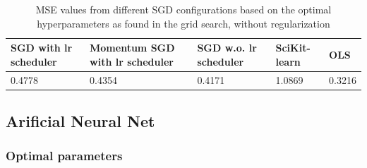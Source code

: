\documentclass
[twocolumn,
secnumarabic,
nobibnotes,
aps,
prl,
reprint,
groupedaddress,
amsmath,
amssymb
]{revtex4-2}
\begin{document}
\begin{table}
  \caption{\label{tab:a_mse_lrlmb}MSE values from different SGD configurations based on the optimal hyperparameters as found in the grid search, without regularization}
  \begin{ruledtabular}
    \begin{tabular}{lllll}
      SGD with lr scheduler & Momentum SGD with lr scheduler & SGD w.o. lr scheduler & SciKit-learn & OLS    \\
      \hline
      0.4778                & 0.4354                         & 0.4171                & 1.0869       & 0.3216 \\
    \end{tabular}
  \end{ruledtabular}
\end{table}

\subsection{Arificial Neural Net}


\subsubsection{Optimal parameters}
\end{document}
